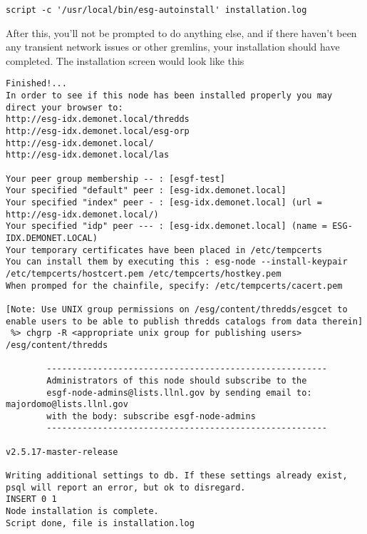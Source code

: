 \begin{verbatim}
script -c '/usr/local/bin/esg-autoinstall' installation.log
\end{verbatim}

After this, you'll not be prompted to do anything else, and if there
haven't been any transient network issues or other gremlins, your
installation should have completed. The installation screen would look
like this

\begin{verbatim}
Finished!...
In order to see if this node has been installed properly you may direct your browser to:
http://esg-idx.demonet.local/thredds
http://esg-idx.demonet.local/esg-orp
http://esg-idx.demonet.local/
http://esg-idx.demonet.local/las

Your peer group membership -- : [esgf-test]
Your specified "default" peer : [esg-idx.demonet.local]
Your specified "index" peer - : [esg-idx.demonet.local] (url = http://esg-idx.demonet.local/)
Your specified "idp" peer --- : [esg-idx.demonet.local] (name = ESG-IDX.DEMONET.LOCAL)
Your temporary certificates have been placed in /etc/tempcerts
You can install them by executing this : esg-node --install-keypair /etc/tempcerts/hostcert.pem /etc/tempcerts/hostkey.pem
When promped for the chainfile, specify: /etc/tempcerts/cacert.pem

[Note: Use UNIX group permissions on /esg/content/thredds/esgcet to enable users to be able to publish thredds catalogs from data therein]
 %> chgrp -R <appropriate unix group for publishing users> /esg/content/thredds

        -------------------------------------------------------
        Administrators of this node should subscribe to the
        esgf-node-admins@lists.llnl.gov by sending email to: majordomo@lists.llnl.gov
        with the body: subscribe esgf-node-admins
        -------------------------------------------------------

v2.5.17-master-release

Writing additional settings to db. If these settings already exist, psql will report an error, but ok to disregard.
INSERT 0 1
Node installation is complete.
Script done, file is installation.log
\end{verbatim}

